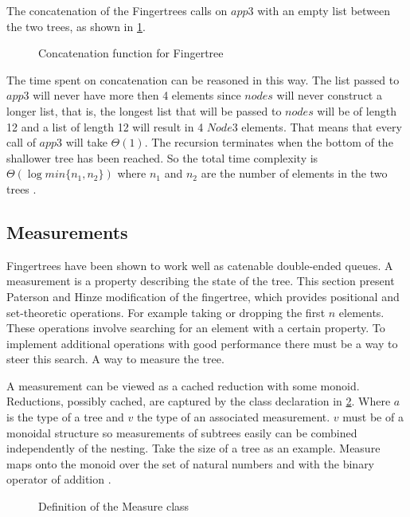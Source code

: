 The concatenation of the Fingertrees calls on $app3$ with an empty list
between the two trees, as shown in \cref{fig:concat}.

\begin{figure}[h!]

\caption{Concatenation function for Fingertree \label{fig:concat}}
\end{figure}

The time spent on concatenation can be reasoned in this way. The list passed to
$app3$ will never have more then 4 elements since $nodes$ will never
construct a longer list, that is, the longest list that will be passed
to $nodes$ will be of length 12 and a list of length 12 will result in 4 $Node3$
elements. That means that every call of $app3$ will take $\Theta(1)$. The
recursion terminates when the bottom of the shallower tree has been reached. So
the total time complexity is $\Theta(\log min\{n_1, n_2\})$ where $n_1$ and
$n_2$ are the number of elements in the two trees \cite{fingertree}.

\subsection{Measurements}
Fingertrees have been shown to work well as catenable double-ended queues. A 
measurement is a property describing the state of the tree. This section present
Paterson and Hinze modification of the fingertree, which provides positional and
set-theoretic operations. For example taking or dropping the first $n$ elements.
These operations involve searching for an element with a certain property.
To implement additional operations with good performance there must be a way
to steer this search. A way to measure the tree.

A measurement can be viewed as a cached reduction with some monoid. 
Reductions, possibly cached, are captured by the class declaration in 
\cref{fig:measure}. Where $a$ is the type of a tree and $v$ the type of an
associated measurement. $v$ must be of a monoidal structure so measurements of
subtrees easily can be combined independently of the nesting. Take the size of a
tree as an example. Measure maps onto the monoid over the set of natural numbers
and with the binary operator of addition \cite{fingertree}.

\begin{figure}[h!]

\caption{Definition of the Measure class \label{fig:measure}}
\end{figure}

